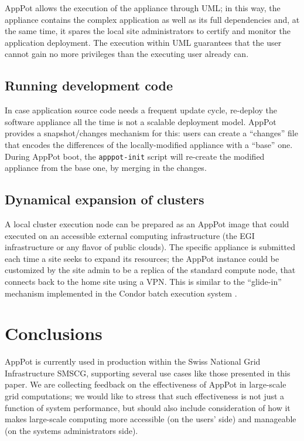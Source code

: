 \documentclass{PoS}
\begin{document}
AppPot allows the execution of the appliance through \ac{UML}; in this
way, the appliance contains the complex application as well as its
full dependencies and, at the same time, it spares the local site
administrators to certify and monitor the application deployment. The
execution within \ac{UML} guarantees that the user cannot gain no more
privileges than the executing user already can.

\subsection{Running development code}
\label{sec:usage-development}

In case application source code needs a frequent update cycle,
re-deploy the software appliance all the time is not a scalable
deployment model. AppPot provides a snapshot/changes mechanism for
this: users can create a ``changes'' file that encodes the differences
of the locally-modified appliance with a ``base'' one. During AppPot
boot, the \texttt{apppot-init} script will re-create the modified
appliance from the base one, by merging in the changes.

\subsection{Dynamical expansion of clusters}
\label{sec:cloudbursting}

A local cluster execution node can be prepared as an AppPot image that
could executed on an accessible external computing infrastructure (the
EGI infrastructure or any flavor of public clouds). The specific
appliance is submitted each time a site seeks to expand its
resources; the AppPot instance could be customized by the site admin
to be a replica of the standard compute node, that connects back to
the home site using a \acs{VPN}. This is similar
to the ``glide-in'' mechanism implemented in the Condor batch
execution system \cite{thain+livny:2005}. 


\section{Conclusions}
\label{sec:conclusions}

AppPot is currently used in production within the Swiss National Grid
Infrastructure \acs{SMSCG}, supporting several use cases like those
presented in this paper.  We are collecting feedback on the
effectiveness of AppPot in large-scale grid computations; we would
like to stress that such effectiveness is not just a function of
system performance, but should also include consideration of how it
makes large-scale computing more accessible (on the users' side) and
manageable (on the systems administrators side).
\end{document}
